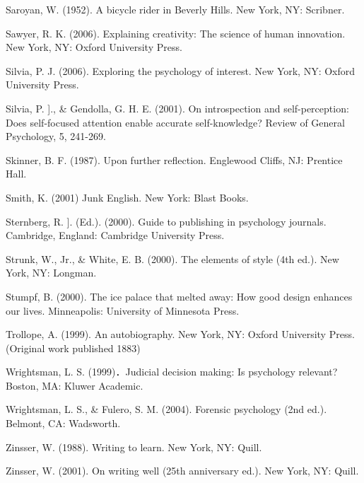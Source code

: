 \documentclass[lang=cn,newtx,14pt,scheme=chinese]{elegantbook}
\begin{document}
Saroyan, W. (1952). A bicycle rider in Beverly Hills. New York, NY: Scribner.

Sawyer, R. K. (2006). Explaining creativity: The science of human innovation. New York, NY: Oxford University Press.

Silvia, P. J. (2006). Exploring the psychology of interest. New York, NY: Oxford University Press.

Silvia, P. ]., \& Gendolla, G. H. E. (2001). On introspection and self-perception: Does self-focused attention enable accurate self-knowledge? Review of General Psychology, 5, 241-269.

Skinner, B. F. (1987). Upon further reflection. Englewood Cliffs, NJ: Prentice Hall.

Smith, K. (2001) Junk English. New York: Blast Books.

Sternberg, R. ]. (Ed.). (2000). Guide to publishing in psychology journals. Cambridge, England: Cambridge University Press.

Strunk, W., Jr., \& White, E. B. (2000). The elements of style (4th ed.). New York, NY: Longman.

Stumpf, B. (2000). The ice palace that melted away: How good design enhances our lives. Minneapolis: University of Minnesota Press.

Trollope, A. (1999). An autobiography. New York, NY: Oxford University Press. (Original work published 1883)

Wrightsman, L. S. (1999)．Judicial decision making: Is psychology relevant? Boston, MA: Kluwer Academic.

Wrightsman, L. S., \& Fulero, S. M. (2004). Forensic psychology (2nd ed.). Belmont, CA: Wadsworth.

Zinsser, W. (1988). Writing to learn. New York, NY: Quill.

Zinsser, W. (2001). On writing well (25th anniversary ed.). New York, NY: Quill.
\end{document}
